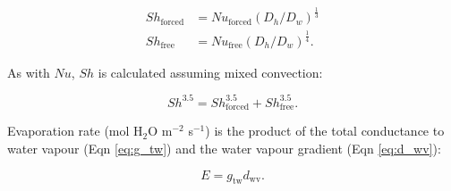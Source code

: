 \documentclass[11pt, oneside]{article}
\begin{document}
\begin{align}
  \mathit{Sh}_\mathrm{forced} & = \mathit{Nu}_\mathrm{forced} (D_h / D_w) ^ \frac{1}{3} \\
  \mathit{Sh}_\mathrm{free} & = \mathit{Nu}_\mathrm{free} (D_h / D_w) ^ \frac{1}{4}.
\end{align}

As with $\mathit{Nu}$, $\mathit{Sh}$ is calculated assuming mixed convection:

\begin{equation}
  \label{eq:sherwood}
  \mathit{Sh} ^ {3.5} = \mathit{Sh}_\mathrm{forced} ^ {3.5} + \mathit{Sh}_\mathrm{free} ^ {3.5}.
\end{equation}

Evaporation rate (mol H$_2$O m$^{-2}$ s$^{-1}$) is the product of the total conductance to water vapour (Eqn \ref{eq:g_tw}) and the water vapour gradient (Eqn \ref{eq:d_wv}):

\begin{equation}
  E = g_\mathrm{tw} d_\mathrm{wv}.
\end{equation}

\clearpage

\end{document}
